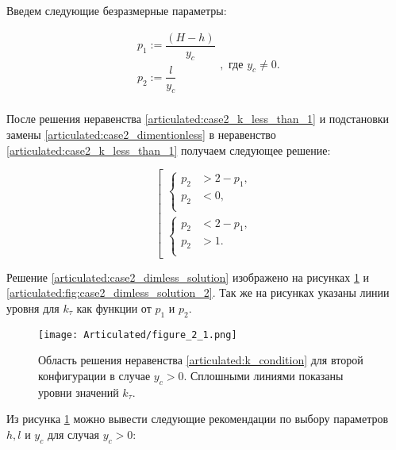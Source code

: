 Введем следующие безразмерные параметры:

\begin{equation}
\label{articulated:case2_dimentionless}
\begin{alignedat}{1}
  p_1 := \dfrac{(H-h)}{y_c}\\
  p_2 := \dfrac{l}{y_c}\\
\end{alignedat}, \text{ где } y_c \ne 0.
\end{equation}

После решения неравенства \ref{articulated:case2_k_less_than_1} и подстановки замены \ref{articulated:case2_dimentionless} в неравенство \ref{articulated:case2_k_less_than_1} получаем следующее решение:


\begin{equation}
\label{articulated:case2_dimless_solution}
\left[
  \begin{alignedat}{1}
    \left\{
      \begin{alignedat}{2}
        p_2 &> 2-p_1,\\
        p_2 &< 0,\\
      \end{alignedat}
    \right.\\
    \left\{
      \begin{alignedat}{2}
        p_2 &< 2- p_1,\\
        p_2 &> 1.\\
      \end{alignedat}
    \right.
  \end{alignedat}
\right.
\end{equation}

Решение \ref{articulated:case2_dimless_solution} изображено на рисунках \ref{articulated:fig:case2_dimless_solution_1} и \ref{articulated:fig:case2_dimless_solution_2}. Так же на рисунках указаны линии уровня для $k_\tau$ как функции от $p_1$ и $p_2$.

\begin{figure}[ht]
  \centering
  \texttt{[image: Articulated/figure\_2\_1.png]}
  \caption{Область решения неравенства \ref{articulated:k_condition} для второй конфигурации в случае $y_c > 0$. Сплошными линиями показаны уровни значений $k_\tau$.}
  \label{articulated:fig:case2_dimless_solution_1}
\end{figure}

Из рисунка \ref{articulated:fig:case2_dimless_solution_1} можно вывести следующие рекомендации по выбору параметров $h,l$ и $y_c$ для случая $y_c > 0$:

